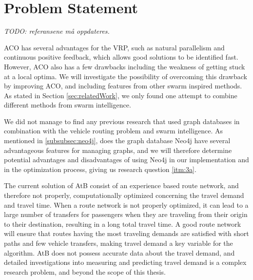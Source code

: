 \section{Problem Statement}

\emph{\color{blue} TODO: referansene må oppdateres.}


ACO has several advantages for the VRP, such as natural parallelism and continuous positive feedback, which allows good solutions to be identified fast. However, ACO also has a few drawbacks including the weakness of getting stuck at a local optima. We will investigate the possibility of overcoming this drawback by improving ACO, and including features from other swarm inspired methods. As stated in Section \vref{sec:relatedWork}, we only found one attempt to combine different methods from swarm intelligence.%

We did not manage to find any previous research that used graph databases in combination with the vehicle routing problem and swarm intelligence. As mentioned in \vref{subsubsec:neo4j}, does the graph database Neo4j \citep{website:neo4j} have several advantageous features for managing graphs, and we will therefore determine potential advantages and disadvantages of using Neo4j in our implementation and in the optimization process, giving us research question \vref{itm:3a}.


The current solution of AtB consist of an experience based route network, and therefore not properly, computationally optimized concerning the travel demand and travel time. When a route network is not properly optimized, it can lead to a large number of transfers for passengers when they are traveling from their origin to their destination, resulting in a long total travel time. A good route network will ensure that routes having the most traveling demands are satisfied with short paths and few vehicle transfers, making travel demand a key variable for the algorithm. AtB\citep{website:atb} does not possess accurate data about the travel demand, and detailed investigations into measuring and predicting travel demand is a complex research problem, and beyond the scope of this thesis. 

